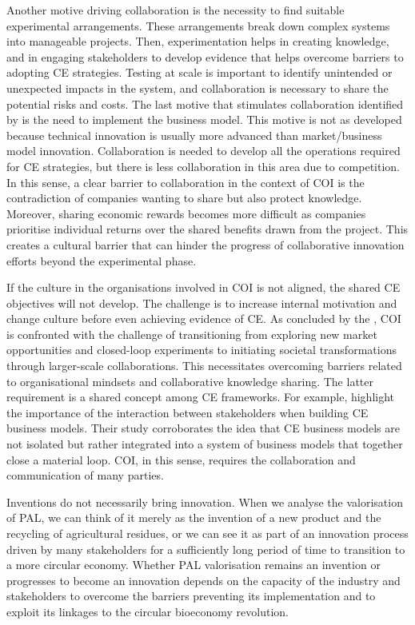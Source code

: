 Another motive driving collaboration is the necessity to find suitable experimental arrangements. These arrangements break down complex systems into manageable projects. Then, experimentation helps in creating knowledge, and in engaging stakeholders to develop evidence that helps overcome barriers to adopting CE strategies. Testing at scale is important to identify unintended or unexpected impacts in the system, and collaboration is necessary to share the potential risks and costs. The last motive that stimulates collaboration identified by \citeauthor{brown2019companies} is the need to implement the business model. This motive is not as developed because technical innovation is usually more advanced than market/business model innovation. Collaboration is needed to develop all the operations required for CE strategies, but there is less collaboration in this area due to competition. In this sense, a clear barrier to collaboration in the context of COI is the contradiction of companies wanting to share but also protect knowledge. Moreover, sharing economic rewards becomes more difficult as companies prioritise individual returns over the shared benefits drawn from the project. This creates a cultural barrier that can hinder the progress of collaborative innovation efforts beyond the experimental phase. 

If the culture in the organisations involved in COI is not aligned, the shared CE objectives will not develop. The challenge is to increase internal motivation and change culture before even achieving evidence of CE. As concluded by the \citeauthor{brown2019companies}, COI is confronted with the challenge of transitioning from exploring new market opportunities and closed-loop experiments to initiating societal transformations through larger-scale collaborations. This necessitates overcoming barriers related to organisational mindsets and collaborative knowledge sharing. The latter requirement is a shared concept among CE frameworks. For example, \cite{antikainen2016framework} highlight the importance of the interaction between stakeholders when building CE business models. Their study corroborates the idea that CE business models are not isolated but rather integrated into a system of business models that together close a material loop. COI, in this sense, requires the collaboration and communication of many parties.

Inventions do not necessarily bring innovation. When we analyse the valorisation of PAL, we can think of it merely as the invention of a new product and the recycling of agricultural residues, or we can see it as part of an innovation process driven by many stakeholders for a sufficiently long period of time to transition to a more circular economy. Whether PAL valorisation remains an invention or progresses to become an innovation depends on the capacity of the industry and stakeholders to overcome the barriers preventing its implementation and to exploit its linkages to the circular bioeconomy revolution.

